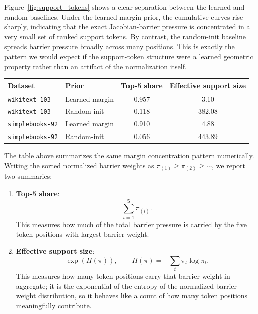 \documentclass[11pt]{article}
\begin{document}
Figure~\ref{fig:support_tokens} shows a clear separation between the learned
and random baselines.
Under the learned margin prior, the cumulative curves rise sharply,
indicating that the exact Jacobian-barrier pressure is concentrated in a very
small set of ranked support tokens. By contrast, the random-init baseline
spreads barrier pressure broadly across many positions. This is exactly the
pattern we would expect if the support-token structure were a learned
geometric property rather than an artifact of the normalization itself.

\begin{center}
\begin{tabular}{llcc}
\toprule
\textbf{Dataset} & \textbf{Prior} & \textbf{Top-5 share} & \textbf{Effective support size} \\
\midrule
\texttt{wikitext-103} & Learned margin & 0.957 & 3.10 \\
\texttt{wikitext-103} & Random-init & 0.118 & 382.08 \\
\addlinespace[2pt]
\texttt{simplebooks-92} & Learned margin & 0.910 & 4.88 \\
\texttt{simplebooks-92} & Random-init & 0.056 & 443.89 \\
\bottomrule
\end{tabular}
\end{center}

The table above summarizes the same margin concentration pattern numerically.
Writing the sorted normalized barrier weights as
$\pi_{(1)} \ge \pi_{(2)} \ge \cdots$, we report two summaries:
\begin{enumerate}
\item \textbf{Top-5 share}:
      \[
      \sum_{i=1}^5 \pi_{(i)}.
      \]
      This measures how much of the total barrier pressure is carried by the
      five token positions with largest barrier weight.
\item \textbf{Effective support size}:
      \[
      \exp(H(\pi)),
      \qquad
      H(\pi) = -\sum_t \pi_t \log \pi_t .
      \]
      This measures how many token positions carry that barrier weight in
      aggregate; it is the exponential of the entropy of the normalized
      barrier-weight distribution, so it behaves like a count of how many
      token positions meaningfully contribute.
\end{enumerate}
\end{document}
